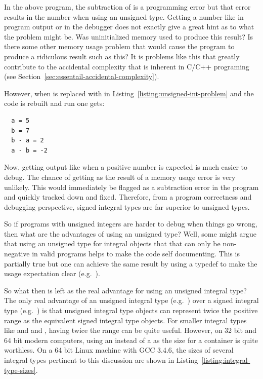 \documentclass[pdf,ps2pdf,11pt]{SANDreport}
\begin{document}
In the above program, the subtraction of {} is a
programming error but that error results in the number
{} when using an unsigned type.  Getting a
number like {} in program output or in the
debugger does not exactly give a great hint as to what the problem
might be.  Was uninitialized memory used to produce this result?  Is
there some other memory usage problem that would cause the program to
produce a ridiculous result such as this?  It is problems like this
that greatly contribute to the accidental complexity that is inherent
in C/C++ programing (see Section~\ref{sec:essentail-accidental-complexity}).

However, when {} is replaced with {} in Listing~\ref{listing:unsigned-int-problem} and the code is
rebuilt and run one gets:


{\small\begin{verbatim}
  a = 5
  b = 7
  b - a = 2
  a - b = -2
\end{verbatim}}


Now, getting output like {} when a positive number is expected
is much easier to debug.  The chance of getting {} as the
result of a memory usage error is very unlikely.  This would
immediately be flagged as a subtraction error in the program and
quickly tracked down and fixed.  Therefore, from a program correctness
and debugging perspective, signed integral types are far superior to
unsigned types.

So if programs with unsigned integers are harder to debug when things
go wrong, then what are the advantages of using an unsigned type?
Well, some might argue that using an unsigned type for integral
objects that that can only be non-negative in valid programs helps to
make the code self documenting.  This is partially true but one can
achieve the same result by using a typedef to make the usage
expectation clear (e.g.\ {}).

So what then is left as the real advantage for using an unsigned
integral type?  The only real advantage of an unsigned integral type
(e.g.\ {}) over a signed integral type (e.g.\
{}) is that unsigned integral type objects can represent
twice the positive range as the equivalent signed integral type
objects.  For smaller integral types like {} and and
{}, having twice the range can be quite useful.
However, on 32 bit and 64 bit modern computers, using an
{} instead of a {} as the
size for a container is quite worthless.  On a 64 bit Linux machine
with GCC 3.4.6, the sizes of several integral types pertinent to this
discussion are shown in Listing~\ref{listing:integral-type-sizes}.
\end{document}
